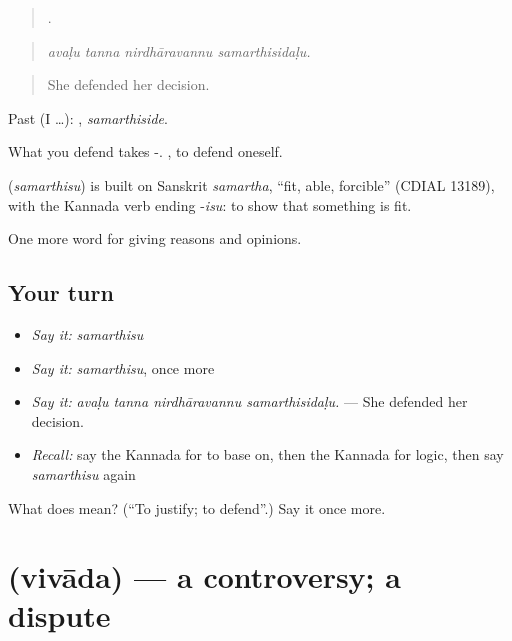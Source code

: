 \begin{quote}
   .
\end{quote}

\begin{quote}
\emph{avaḷu tanna nirdhāravannu samarthisidaḷu.}
\end{quote}

\begin{quote}
She defended her decision.
\end{quote}

Past (I …): , \emph{samarthiside}.

What you defend takes -. , to defend oneself.

\begin{cousinweb}
\textbf{} (\emph{samarthisu}) is built on Sanskrit \emph{samartha}, \textquotedblleft{}fit, able, forcible\textquotedblright{} (CDIAL 13189), with the Kannada verb ending -\emph{isu}: to show that something is fit.
\end{cousinweb}

\begin{grammarlens}[title={What you've built}]
One more word for giving reasons and opinions.
\end{grammarlens}

\subsection*{Your turn}
\begin{itemize}
\raggedright
  \item \emph{Say it:} \emph{samarthisu}
  \item \emph{Say it:} \emph{samarthisu}, once more
  \item \emph{Say it:} \emph{avaḷu tanna nirdhāravannu samarthisidaḷu.} — She defended her decision.
  \item \emph{Recall:} say the Kannada for to base on, then the Kannada for logic, then say \emph{samarthisu} again
\end{itemize}

\begin{tcolorbox}[breakable,colback=teal!4,colframe=teal!35!black,title={Before you move on}]
What does  mean? (\textquotedblleft{}To justify; to defend\textquotedblright{}.) Say it once more.
\end{tcolorbox}
\section[\texorpdfstring{\kn{ವಿವಾದ} (vivāda)}{ವಿವಾದ (vivāda)}]{ (vivāda) — a controversy; a dispute}

